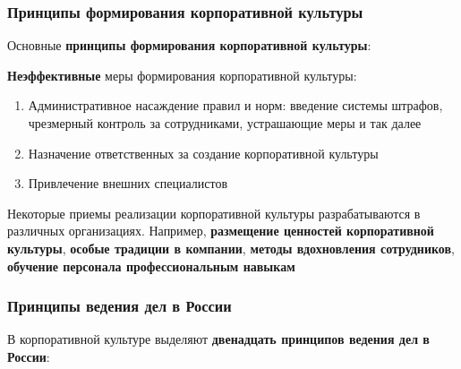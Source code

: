 \subsubsection{Принципы формирования корпоративной культуры}

Основные \textbf{принципы формирования корпоративной культуры}:

\begin{multienumerate}
\end{multienumerate}

\textbf{Неэффективные} меры формирования корпоративной культуры:

\begin{enumerate}
    \item Административное насаждение правил и норм: введение системы штрафов, чрезмерный контроль за сотрудниками, устрашающие меры и так далее
    \item Назначение ответственных за создание корпоративной культуры
    \item Привлечение внешних специалистов
\end{enumerate}

Некоторые приемы реализации корпоративной культуры разрабатываются в различных организациях. Например, \textbf{размещение ценностей корпоративной культуры}, \textbf{особые традиции в компании}, \textbf{методы вдохновления сотрудников}, \textbf{обучение персонала профессиональным навыкам}

\subsubsection{Принципы ведения дел в России}

В корпоративной культуре выделяют \textbf{двенадцать принципов ведения дел в России}:


